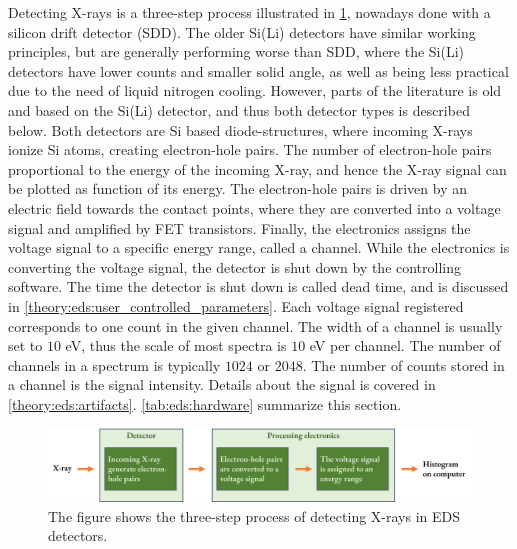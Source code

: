 
Detecting X-rays is a three-step process illustrated in \cref{fig:detecting_xrays}, nowadays done with a silicon drift detector (SDD).
The older Si(Li) detectors have similar working principles, but are generally performing worse than SDD, where the Si(Li) detectors have lower counts and smaller solid angle, as well as being less practical due to the need of liquid nitrogen cooling.
However, parts of the literature is old and based on the Si(Li) detector, and thus both detector types is described below.
Both detectors are Si based diode-structures, where incoming X-rays ionize Si atoms, creating electron-hole pairs.
The number of electron-hole pairs proportional to the energy of the incoming X-ray, and hence the X-ray signal can be plotted as function of its energy.
The electron-hole pairs is driven by an electric field towards the contact points, where they are converted into a voltage signal and amplified by FET transistors.
Finally, the electronics assigns the voltage signal to a specific energy range, called a channel.
While the electronics is converting the voltage signal, the detector is shut down by the controlling software.
The time the detector is shut down is called dead time, and is discussed in \cref{theory:eds:user_controlled_parameters}.
Each voltage signal registered corresponds to one count in the given channel.
The width of a channel is usually set to $10$ eV, thus the scale of most spectra is $10$ eV per channel.
The number of channels in a spectrum is typically $1024$ or $2048$.
The number of counts stored in a channel is the signal intensity.
Details about the signal is covered in \cref{theory:eds:artifacts}.
\cref{tab:eds:hardware} summarize this section.


\begin{figure}[ht]
    \centering
    \includegraphics[width=0.9\linewidth]{figures/detecting_xrays.png}
    \caption{
        The figure shows the three-step process of detecting X-rays in EDS detectors.
    }
    \label{fig:detecting_xrays}
\end{figure}




